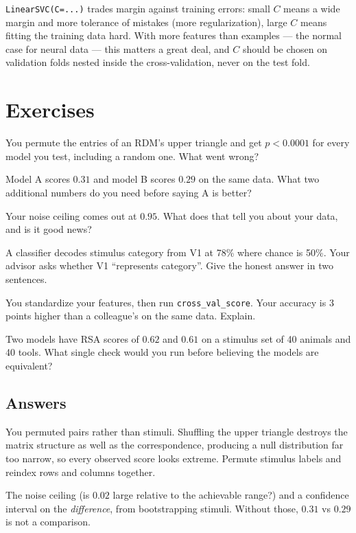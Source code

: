 \documentclass[11pt]{article}
\begin{document}
\texttt{LinearSVC(C=...)} trades margin against training errors: small $C$
means a wide margin and more tolerance of mistakes (more regularization), large
$C$ means fitting the training data hard. With more features than examples ---
the normal case for neural data --- this matters a great deal, and $C$ should be
chosen on validation folds nested inside the cross-validation, never on the test
fold.

\section{Exercises}

 You permute the entries of an RDM's upper triangle and get $p < 0.0001$
for every model you test, including a random one. What went wrong?

 Model A scores $0.31$ and model B scores $0.29$ on the same data. What
two additional numbers do you need before saying A is better?

 Your noise ceiling comes out at $0.95$. What does that tell you about
your data, and is it good news?

 A classifier decodes stimulus category from V1 at 78\% where chance is
50\%. Your advisor asks whether V1 ``represents category''. Give the honest
answer in two sentences.

 You standardize your features, then run \texttt{cross\_val\_score}.
Your accuracy is 3 points higher than a colleague's on the same data. Explain.

 Two models have RSA scores of $0.62$ and $0.61$ on a stimulus set of
40 animals and 40 tools. What single check would you run before believing the
models are equivalent?

\subsection*{Answers}

 You permuted pairs rather than stimuli. Shuffling the upper triangle
destroys the matrix structure as well as the correspondence, producing a null
distribution far too narrow, so every observed score looks extreme. Permute
stimulus labels and reindex rows and columns together.

 The noise ceiling (is $0.02$ large relative to the achievable range?)
and a confidence interval on the \emph{difference}, from bootstrapping stimuli.
Without those, $0.31$ vs $0.29$ is not a comparison.
\end{document}
